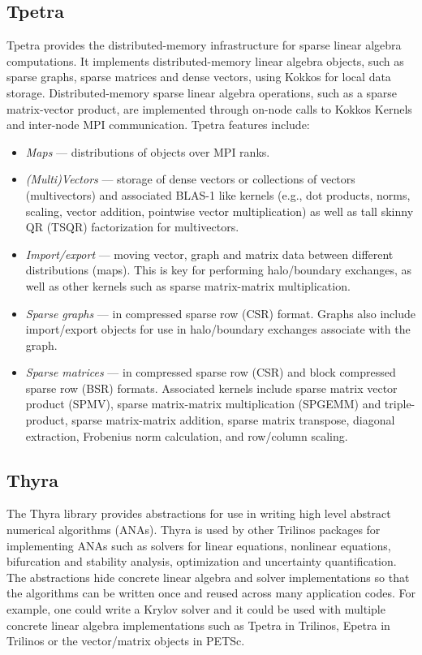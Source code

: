 \subsection{Tpetra}\label{subsec:tpetra}
Tpetra \cite{hoemmen2015tpetra} provides the distributed-memory
infrastructure for sparse linear algebra computations.  It implements
distributed-memory linear algebra objects, such as sparse graphs,
sparse matrices and dense vectors, using Kokkos for local data
storage.  Distributed-memory sparse linear algebra operations, such as
a sparse matrix-vector product, are implemented through on-node calls
to Kokkos Kernels and inter-node MPI communication.   Tpetra features
include:
\begin{itemize}
\item \textit{Maps} --- distributions of objects over MPI ranks.
\item \textit{(Multi)Vectors} --- storage of dense vectors or collections of
vectors (multivectors) and associated BLAS-1 like kernels (e.g., dot
products, norms, scaling, vector addition, pointwise vector
multiplication) as well as tall skinny QR (TSQR)  factorization for multivectors.
\item \textit{Import/export} --- moving vector, graph and matrix data
between different distributions (maps).  This is key for performing
halo/boundary exchanges, as well as other kernels such as
sparse matrix-matrix multiplication.
\item \textit{Sparse graphs} --- in compressed sparse row (CSR)
format.  Graphs also include import/export objects for use in
halo/boundary exchanges associate with the graph.
\item \textit{Sparse matrices} --- in compressed sparse row (CSR) and
block compressed sparse row (BSR) formats.  Associated kernels include
sparse matrix vector product (SPMV), sparse matrix-matrix
multiplication (SPGEMM) and triple-product, sparse matrix-matrix addition, sparse matrix transpose, diagonal extraction,
Frobenius norm calculation, and row/column scaling.
\end{itemize}


\subsection{Thyra}
The Thyra library provides abstractions for use in writing high level abstract numerical algorithms (ANAs). Thyra is used by other Trilinos packages for implementing ANAs such as solvers for linear equations, nonlinear equations, bifurcation and stability analysis, optimization and uncertainty quantification. The abstractions hide concrete linear algebra and solver implementations so that the algorithms can be written once and reused across many application codes. For example, one could write a Krylov solver and it could be used with multiple concrete linear algebra implementations such as Tpetra in Trilinos, Epetra in Trilinos or the vector/matrix objects in PETSc.

